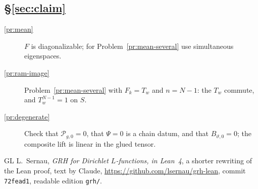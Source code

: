 \documentclass[reqno]{amsart}
\theoremstyle{definition}
\theoremstyle{plain}
\newcommand{\Pc}{\mathcal{P}}
\begin{document}
\subsection*{\S\ref{sec:claim}}
\begin{description}
\item[\ref{pr:mean}] \(F\) is diagonalizable; for Problem~\ref{pr:mean-several} use simultaneous eigenspaces.
\item[\ref{pr:ram-image}] Problem~\ref{pr:mean-several} with \(F_k=T_w\) and \(n=N-1\): the \(T_w\) commute, and \(T_w^{N-1}=1\) on \(S\).
\item[\ref{pr:degenerate}] Check that \(\Pc_{g,0} = 0\), that \(\Psi = 0\) is a chain datum, and that \(B_{\vartheta,0} = 0\); the composite lift is linear in the glued tensor.
\end{description}

\begin{thebibliography}{GL}
 L.~Sernau, \emph{GRH for Dirichlet \(L\)-functions, in Lean~4}, a shorter rewriting of the Lean proof, text by Claude, \url{https://github.com/lsernau/grh-lean}, commit \texttt{72fead1}, readable edition \texttt{grh/}.
\end{thebibliography}
\end{document}
